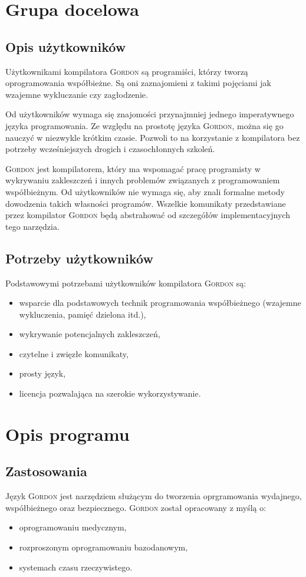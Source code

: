 \documentclass{documentation}
\begin{document}
\section{Grupa docelowa}
\subsection{Opis użytkowników}
\noindent Użytkownikami kompilatora \textsc{Gordon} są programiści, którzy tworzą oprogramowania współbieżne. Są oni zaznajomieni z takimi pojęciami jak wzajemne wykluczanie czy zagłodzenie.

Od użytkowników wymaga się znajomości przynajmniej jednego imperatywnego języka programowania. Ze względu na prostotę języka \textsc{Gordon}, można się go nauczyć w niezwykle krótkim czasie. Pozwoli to na korzystanie z kompilatora bez potrzeby wcześniejszych drogich i czasochłonnych szkoleń.

\textsc{Gordon} jest kompilatorem, który ma wspomagać pracę programisty w wykrywaniu zakleszczeń i innych problemów związanych z programowaniem współbieżnym. Od użytkowników nie wymaga się, aby znali formalne metody dowodzenia takich własności programów. Wszelkie komunikaty przedstawiane przez kompilator \textsc{Gordon} będą abstrahować od szczegółów implementacyjnych tego narzędzia.

\subsection{Potrzeby użytkowników}
\noindent Podstawowymi potrzebami użytkowników kompilatora \textsc{Gordon} są:
\begin{itemize}
\item wsparcie dla podstawowych technik programowania współbieżnego (wzajemne wykluczenia, pamięć dzielona itd.),
\item wykrywanie potencjalnych zakleszczeń,
\item czytelne i zwięzłe komunikaty,
\item prosty język,
\item licencja pozwalająca na szerokie wykorzystywanie.
\end{itemize}

\section{Opis programu}
\subsection{Zastosowania}
\noindent Język \textsc{Gordon} jest narzędziem służącym do tworzenia oprgramowania wydajnego, współbieżnego oraz bezpiecznego. 
\textsc{Gordon} został opracowany z myślą o:
\begin{itemize}
    \item oprogramowaniu medycznym,
    \item rozproszonym oprogramowaniu bazodanowym,
    \item systemach czasu rzeczywistego.
\end{itemize}
\end{document}

